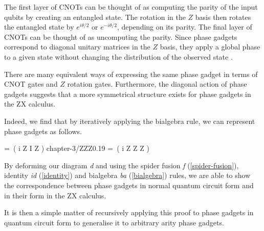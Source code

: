 The first layer of CNOTs can be thought of as computing the parity of the input qubits by creating an entangled state. The rotation in the $Z$ basis then rotates the entangled state by $e^{i\theta/2}$ or $e^{-i\theta/2}$, depending on its parity. The final layer of CNOTs can be thought of as uncomputing the parity. Since phase gadgets correspond to diagonal unitary matrices in the $Z$ basis, they apply a global phase to a given state without changing the distribution of the observed state \cite{Yeung2020}.

There are many equivalent ways of expressing the same phase gadget in terms of CNOT gates and $Z$ rotation gates. Furthermore, the diagonal action of phase gadgets suggests that a more symmetrical structure exists for phase gadgets in the ZX calculus.

Indeed, we find that by iteratively applying the bialgebra rule, we can represent phase gadgets as follows.

{=\,  \left( i  Z \otimes I \otimes Z \right)}
{chapter-3/ZZZ}{0.19}
{=\,  \left( i  Z \otimes Z \otimes Z \right)}

By deforming our diagram \textit{d} and using the spider fusion \textit{f} (\ref{spider-fusion}), identity \textit{id} (\ref{identity}) and bialgebra \textit{ba} (\ref{bialgebra}) rules, we are able to show the correspondence between phase gadgets in normal quantum circuit form and in their form in the ZX calculus.


It is then a simple matter of recursively applying this proof to phase gadgets in quantum circuit form to generalise it to arbitrary arity phase gadgets.

